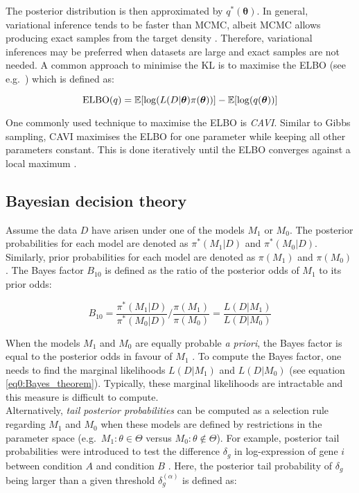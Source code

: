 The posterior distribution is then approximated by $q^\ast(\bm{\theta})$\citep{Blei2017}. In general, variational inference tends to be faster than MCMC, albeit MCMC allows producing exact samples from the target density \citep{Blei2017}. Therefore, variational inferences may be preferred when datasets are large and exact samples are not needed. A common approach to minimise the KL is to maximise the \gls{ELBO} (see e.g.~\citep{Beal2003}) which is defined as:

\begin{equation}
\textnormal{ELBO}(q)=\mathbb{E}[\log(L(D|\bm{\theta})\pi(\bm{\theta}))] - \mathbb{E}[\log(q(\bm{\theta}))]
\end{equation}

One commonly used technique to maximise the ELBO is \emph{\gls{CAVI}}. Similar to Gibbs sampling, CAVI maximises the ELBO for one parameter while keeping all other parameters constant. This is done iteratively until the ELBO converges against a local maximum \citep{Blei2017}. 

\subsection{Bayesian decision theory} \label{sec0:decision}

Assume the data $D$ have arisen under one of the models $M_1$ or $M_0$. The posterior probabilities for each model are denoted as $\pi^*(M_1|D)$ and $\pi^*(M_0|D)$. Similarly, prior probabilities for each model are denoted as $\pi(M_1)$ and $\pi(M_0)$. The Bayes factor $B_{10}$ \citep{Jeffreys1961} is defined as the ratio of the posterior odds of $M_1$ to its prior odds:

\begin{equation}
B_{10}=\frac{\pi^*(M_1|D)}{\pi^*(M_0|D)}/{}\frac{\pi(M_1)}{\pi(M_0)}=\frac{L(D|M_1)}{L(D|M_0)}
\end{equation}  

When the models $M_1$ and $M_0$ are equally probable \emph{a priori}, the Bayes factor is equal to the posterior odds in favour of $M_1$ \citep{Kass1995}. To compute the Bayes factor, one needs to find the marginal likelihoods $L(D|M_1)$ and $L(D|M_0)$ (see equation \eqref{eq0:Bayes_theorem}). Typically, these marginal likelihoods are intractable and this measure is difficult to compute. \\

Alternatively, \emph{tail posterior probabilities} can be computed as a selection rule regarding $M_1$ and $M_0$ when these models are defined by restrictions in the parameter space (e.g.~$M_1:\theta\in\Theta$ versus $M_0:\theta\notin\Theta$). For example, posterior tail probabilities were introduced to test the difference $\delta_g$ in log-expression of gene $i$ between condition $A$ and condition $B$ \citep{Bochkina2007}. Here, the posterior tail probability of $\delta_g$ being larger than a given threshold $\delta_g^{(\alpha)}$ is defined as:

